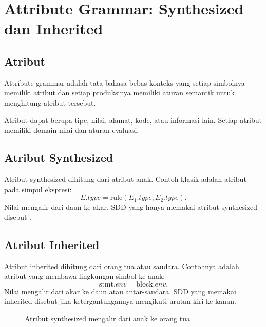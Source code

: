 \section{Attribute Grammar: Synthesized dan Inherited}
\label{sec:ch14-attribute}

\subsection{Atribut}

\begin{definisi}
Attribute grammar adalah tata bahasa bebas konteks yang setiap
simbolnya memiliki atribut dan setiap produksinya memiliki aturan
semantik untuk menghitung atribut tersebut.
\end{definisi}

Atribut dapat berupa tipe, nilai, alamat, kode, atau informasi lain.
Setiap atribut memiliki domain nilai dan aturan evaluasi.

\subsection{Atribut Synthesized}

Atribut synthesized dihitung dari atribut anak. Contoh klasik adalah
atribut  pada simpul ekspresi:
\[
E.type = \text{rule}(E_1.type, E_2.type).
\]
Nilai mengalir dari daun ke akar. SDD yang hanya memakai atribut
synthesized disebut .

\subsection{Atribut Inherited}

Atribut inherited dihitung dari orang tua atau saudara. Contohnya
adalah atribut  yang membawa lingkungan simbol ke anak:
\[
\text{stmt}.env = \text{block}.env.
\]
Nilai mengalir dari akar ke daun atau antar-saudara. SDD yang
memakai inherited disebut  jika ketergantungannya
mengikuti urutan kiri-ke-kanan.

\begin{figure}[H]
\centering
{}
\caption{Atribut synthesized mengalir dari anak ke orang tua}
\label{fig:ch14-synthesized}
\end{figure}

